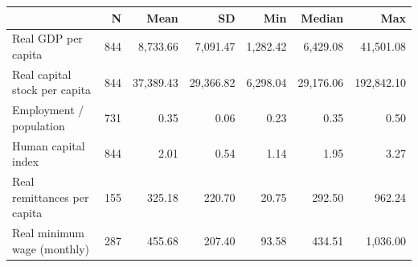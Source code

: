 \begin{tabular}{l*{6}{r}}
\toprule
                    &           N&        Mean&          SD&         Min&      Median&         Max\\
\midrule
Real GDP per capita &         844&    8,733.66&    7,091.47&    1,282.42&    6,429.08&   41,501.08\\
Real capital stock per capita&         844&   37,389.43&   29,366.82&    6,298.04&   29,176.06&  192,842.10\\
Employment / population&         731&        0.35&        0.06&        0.23&        0.35&        0.50\\
Human capital index &         844&        2.01&        0.54&        1.14&        1.95&        3.27\\
Real remittances per capita&         155&      325.18&      220.70&       20.75&      292.50&      962.24\\
Real minimum wage (monthly)&         287&      455.68&      207.40&       93.58&      434.51&    1,036.00\\
\bottomrule
\end{tabular}
